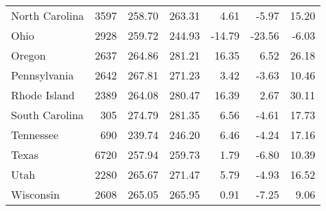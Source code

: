 \begin{table}[ht]
\begin{center}
\begin{tabular}{lrrrrrr}
  North Carolina & 3597 & 258.70 & 263.31 & 4.61 & -5.97 & 15.20 \\ 
  Ohio & 2928 & 259.72 & 244.93 & -14.79 & -23.56 & -6.03 \\ 
  Oregon & 2637 & 264.86 & 281.21 & 16.35 & 6.52 & 26.18 \\ 
  Pennsylvania & 2642 & 267.81 & 271.23 & 3.42 & -3.63 & 10.46 \\ 
  Rhode Island & 2389 & 264.08 & 280.47 & 16.39 & 2.67 & 30.11 \\ 
  South Carolina & 305 & 274.79 & 281.35 & 6.56 & -4.61 & 17.73 \\ 
  Tennessee & 690 & 239.74 & 246.20 & 6.46 & -4.24 & 17.16 \\ 
  Texas & 6720 & 257.94 & 259.73 & 1.79 & -6.80 & 10.39 \\ 
  Utah & 2280 & 265.67 & 271.47 & 5.79 & -4.93 & 16.52 \\ 
  Wisconsin & 2608 & 265.05 & 265.95 & 0.91 & -7.25 & 9.06 \\ 
   \hline
\end{tabular}
\end{center}
\end{table}
